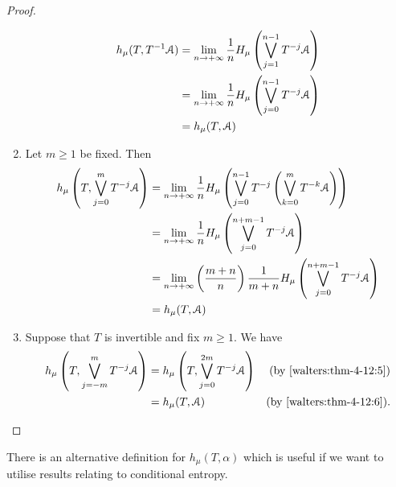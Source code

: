 \begin{theorem}
\begin{proof}
\begin{enumerate}
				\begin{align*}
					h_\mu(T, T^{-1}{\mathcal{A}}) &= \lim_{n \to +\infty}{\frac{1}{n} H_\mu\left(\bigvee_{j = 1}^{n - 1}{T^{-j}{\mathcal{A}}}\right)} \\
						&= \lim_{n \to +\infty}{\frac{1}{n} H_\mu\left(\bigvee_{j = 0}^{n - 1}{T^{-j}{\mathcal{A}}}\right)} \\
						&= h_\mu(T, \mathcal{A})
				\end{align*}
			\item Let $m \geq 1$ be fixed. Then
				\begin{align*}
					h_\mu\left(T, \bigvee_{j = 0}^{m}{T^{-j}{\mathcal{A}}}\right) &= \lim_{n \to +\infty}{\frac{1}{n} H_\mu\left(\bigvee_{j = 0}^{n - 1}{T^{-j}\left(\bigvee_{k = 0}^{m}{T^{-k}{\mathcal{A}}}\right)}\right)} \\
						&= \lim_{n \to +\infty}{\frac{1}{n} H_\mu\left(\bigvee_{j = 0}^{n + m - 1}{T^{-j}{\mathcal{A}}}\right)} \\
						&= \lim_{n \to +\infty}{\left(\frac{m + n}{n}\right) \frac{1}{m + n} H_\mu\left(\bigvee_{j = 0}^{n + m - 1}{T^{-j}{\mathcal{A}}}\right)} \\
						&= h_\mu(T, \mathcal{A})
				\end{align*}
			\item Suppose that $T$ is invertible and fix $m \geq 1$. We have
				\begin{align*}
					h_\mu\left(T, \bigvee_{j = -m}^{m}{T^{-j}{\mathcal{A}}}\right) &= h_\mu\left(T, \bigvee_{j = 0}^{2m}{T^{-j}{\mathcal{A}}}\right) & \text{(by \ref{walters:thm-4-12:5})} \\
						&= h_\mu(T, \mathcal{A}) & \text{(by \ref{walters:thm-4-12:6}).}
				\end{align*}
		\end{enumerate}
	\end{proof}
\end{theorem}

There is an alternative definition for $h_\mu(T, \alpha)$ which is useful if we want to utilise results relating to conditional entropy.

